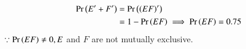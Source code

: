  \begin{align} 
	 \Pr\left(E^\prime+ F^\prime\right)&= \Pr\left(\left(EF\right)^\prime\right)
	 \\
	 &=1-\Pr\left(EF\right)\implies \Pr\left(EF\right)=0.75 
 \end{align}	
 $\because \Pr\left(EF\right)\ne 0, E$ and $F$ are not mutually exclusive.
 
